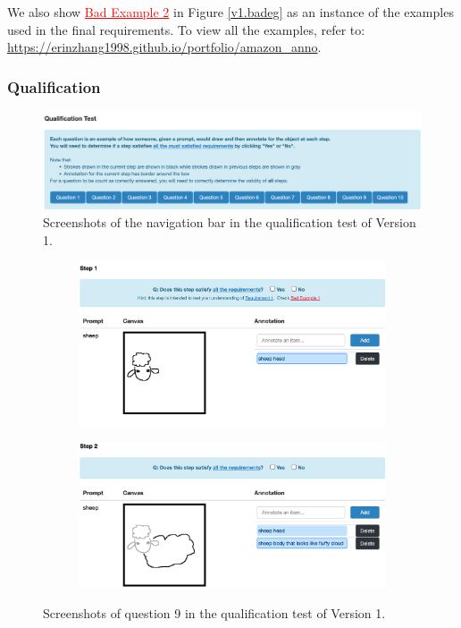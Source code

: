We also show \textcolor{red}{\underline{Bad Example 2}} in Figure \ref{v1.badeg} as an instance of the examples used in the final requirements. To view all the examples, refer to: \url{https://erinzhang1998.github.io/portfolio/amazon_anno}. 

\subsubsection{Qualification}

\begin{figure}[!htb]
\includegraphics[width=\linewidth]{data_collection/v1_qual_header.png}  
\caption{Screenshots of the navigation bar in the qualification test of Version 1.}
\label{v1.qualification.nav}
\end{figure}

\begin{figure}[!htb]
\begin{subfigure}{\textwidth}
\centering
\includegraphics[width=.8\linewidth]{data_collection/v1_qual_q9_1.png}  
\end{subfigure}
\newline
\begin{subfigure}{\textwidth}
\centering
\includegraphics[width=.8\linewidth]{data_collection/v1_qual_q9_2.png}  
\end{subfigure}
\caption{Screenshots of question 9 in the qualification test of Version 1.}
\label{v1.qualification.q9}
\end{figure}

